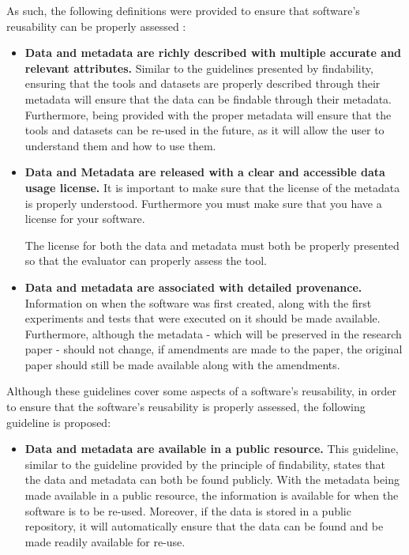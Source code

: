 \documentclass{cisfyp}
\begin{document}
As such, the following definitions were provided to ensure that software's reusability can be properly assessed \cite{dbcls}:
\begin{itemize}
	\item \textbf{Data and metadata are richly described with multiple accurate and relevant attributes.}\newline
	Similar to the guidelines presented by findability, ensuring that the tools and datasets are properly described through their metadata will ensure that the data can be findable through their metadata. Furthermore, being provided with the proper metadata will ensure that the tools and datasets can be re-used in the future, as it will allow the user to understand them and how to use them. 
	
	\item \textbf{Data and Metadata are released with a clear and accessible data usage license.}\newline
	It is important to make sure that the license of the metadata is properly understood. Furthermore you must make sure that you have a license for your software.
	
	The license for both the data and metadata must both be properly presented so that the evaluator can properly assess the tool.
	
	\item \textbf{Data and metadata are associated with detailed provenance.}\newline
	Information on when the software was first created, along with the first experiments and tests that were executed on it should be made available. Furthermore, although the metadata - which will be preserved in the research paper - should not change, if amendments are made to the paper, the original paper should still be made available along with the amendments.
\end{itemize}
Although these guidelines cover some aspects of a software's reusability, in order to ensure that the software's reusability is properly assessed, the following guideline is proposed:
\begin{itemize}
	\item \textbf{Data and metadata are available in a public resource.}\newline
	This guideline, similar to the guideline provided by the principle of findability, states that the data and metadata can both be found publicly. With the metadata being made available in a public resource, the information is available for when the software is to be re-used. Moreover, if the data is stored in a public repository, it will automatically ensure that the data can be found and be 
	made readily available for re-use.
\end{itemize}
\end{document}
